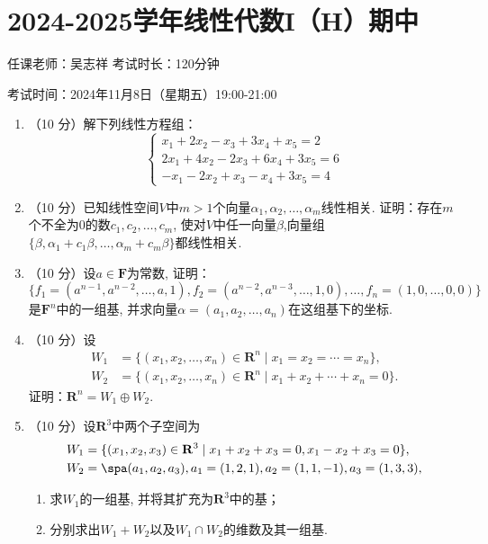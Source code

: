 \section{2024-2025学年线性代数I（H）期中}

\begin{center}
    任课老师：吴志祥\hspace{4em} 考试时长：120分钟

    考试时间：2024年11月8日（星期五）19:00-21:00
\end{center}

\begin{enumerate}
    \item （10 分）解下列线性方程组：
          \[
              \begin{cases}
                  x_1 + 2x_2 - x_3 + 3x_4 +x_5 = 2     \\
                  2x_1 + 4x_2 - 2x_3 + 6x_4 + 3x_5 = 6 \\
                  -x_1 - 2x_2 + x_3 - x_4 + 3x_5 = 4
              \end{cases}
          \]

    \item （10 分）已知线性空间\(V\)中\(m > 1\)个向量\(\alpha_1,\alpha_2,\ldots,\alpha_{m}\)线性相关. 证明：存在\(m\)个不全为\(0\)的数\(c_1,c_2,\ldots,c_{m}\), 使对\(V\)中任一向量\(\beta\),向量组\(\{ \beta,\alpha_1 + c_1\beta,\ldots,\alpha_{m} + c_{m}\beta \}\)都线性相关.

    \item （10 分）设\(a \in \mathbf{F}\)为常数, 证明：
          \[\{ f_1 = ( a^{n - 1},a^{n - 2},\ldots,a,1 ),f_2 = ( a^{n - 2},a^{n - 3},\ldots,1,0 ),\ldots,f_{n} = (1,0,\ldots,0,0)\}\]
          是\(\mathbf{F}^{n}\)中的一组基, 并求向量\(\alpha = ( a_1,a_2,\ldots,a_{n} )\)在这组基下的坐标.

    \item （10 分）设
          \begin{align*}
              W_1 &= \{ ( x_1,x_2,\ldots,x_{n} ) \in  \mathbf{R}^{n} \mid x_1 = x_2 = \cdots = x_{n} \}, \\
              W_2 &= \{ ( x_1,x_2,\ldots,x_{n} ) \in  \mathbf{R}^{n} \mid x_1 + x_2 + \cdots + x_{n} = 0 \}.
          \end{align*}
          证明：\(\mathbf{R}^{n} = W_1 \oplus W_2\).

    \item （10 分）设\(\mathbf{R}^3\)中两个子空间为
          \begin{align*}
              W_1 &= \{ ( x_1,x_2,x_3 ) \in \mathbf{R}^3 \mid x_1 + x_2 + x_3 = 0,x_1 - x_2 + x_3 = 0 \}, \\
              W_2 &= \spa( a_1,a_2,a_3 ),a_1 = (1,2,1),a_2 = (1,1, - 1),a_3 = (1,3,3),
          \end{align*}
          \begin{enumerate}
              \item 求\(W_1\)的一组基, 并将其扩充为\(\mathbf{R}^3\)中的基；
              \item 分别求出\(W_1 + W_2\)以及\(W_1 \cap W_2\)的维数及其一组基.
          \end{enumerate}


\end{enumerate}
